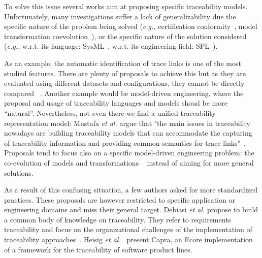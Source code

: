 To solve this issue several works aim at proposing specific traceability models. Unfortunately, many investigations suffer a lack of generalizability due the specific nature of the problem being solved (\textit{e.g.,} certification conformity~\cite{kokaly2017-safety-case-impact-assessment-model-based-automotive}, model transformation coevolution~\cite{Guana_2017}), or the specific nature of the solution considered (\textit{e.g.,} w.r.t. its language: SysML~\cite{nejat2012-traceability-sysml-safety-certification}, w.r.t. its engineering field: SPL~\cite{anquetil2010-model-driven-tracea-for-SPL}). 

As an example, the automatic identification of trace links is one of the most studied features. There are plenty of proposals to achieve this but as they are evaluated using different datasets and configurations, they cannot be directly compared ~\cite{seiler2019-comparing-trac-through-IR-Commits-Logs,guo2017-semantically-enhanced-tracebility-deep-learning,borg2014-SmS-IR-for-traceability}. 
Another example would be model-driven engineering, where the proposal and usage of traceability languages and models shoud be more ``natural''. Nevertheless, not even there we find a unified traceability representation model: Mustafa \textit{et al.} argue that
"the main issues in traceability nowadays are building traceability models that can accommodate the capturing of traceability information and providing common semantics for trace links"~\cite{mustafa2017-literature-review}. Proposals tend to focus also on a specific model-driven engineering problem: the co-evolution of models and transformations ~\cite{amar2013-model-coevolution-uding-traceability,santiago2013traceability-in-MDE,paige2011-traces-in-moel-driven-engineering,feldmann2019-mde-intermodel-inconsistencies} instead of aiming for more general solutions.

As a result of this confusing situation, a few authors asked for more standardized practices. These proposals are however restricted to specific application or engineering domains and miss their general target. Debiasi \textit{et al.} propose to build a common body of knowledge on traceability. They refer to requirements traceability and focus on the organizational challenges of the implementation of traceability approaches~\cite{debiasi2016-traceBoK}. Heisig \textit{et al.}~\cite{heisig2019-generic-traceability-metamodel-end-to-end-capra} present Capra, an Ecore implementation of a framework for the traceability of software product lines. %

